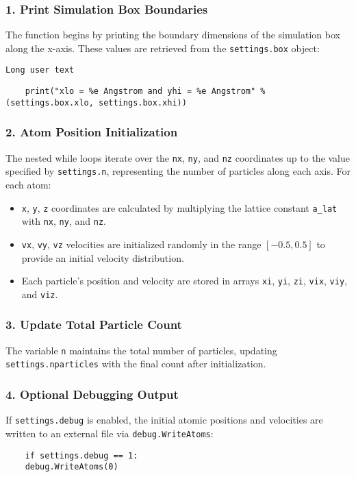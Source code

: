 \documentclass[12pt, ngerman]{report}
\begin{document}
\subsubsection*{1. Print Simulation Box Boundaries}
The function begins by printing the boundary dimensions of the simulation box along the x-axis. These values are retrieved from the \texttt{settings.box} object:

\begin{lstlisting}[breaklines]
	Long user text
\end{lstlisting}

\begin{verbatim}
	print("xlo = %e Angstrom and yhi = %e Angstrom" %  (settings.box.xlo, settings.box.xhi))
\end{verbatim}

\subsubsection*{2. Atom Position Initialization}
The nested while loops iterate over the \texttt{nx}, \texttt{ny}, and \texttt{nz} coordinates up to the value specified by \texttt{settings.n}, representing the number of particles along each axis. For each atom:

\begin{itemize}
	\item \texttt{x}, \texttt{y}, \texttt{z} coordinates are calculated by multiplying the lattice constant \texttt{a\_lat} with \texttt{nx}, \texttt{ny}, and \texttt{nz}.
	\item \texttt{vx}, \texttt{vy}, \texttt{vz} velocities are initialized randomly in the range \([-0.5, 0.5]\) to provide an initial velocity distribution.
	\item Each particle’s position and velocity are stored in arrays \texttt{xi}, \texttt{yi}, \texttt{zi}, \texttt{vix}, \texttt{viy}, and \texttt{viz}.
\end{itemize}

\subsubsection*{3. Update Total Particle Count}
The variable \texttt{n} maintains the total number of particles, updating \texttt{settings.nparticles} with the final count after initialization.

\subsubsection*{4. Optional Debugging Output}
If \texttt{settings.debug} is enabled, the initial atomic positions and velocities are written to an external file via \texttt{debug.WriteAtoms}:
\begin{verbatim}
	if settings.debug == 1:
	debug.WriteAtoms(0)
\end{verbatim}
\end{document}
